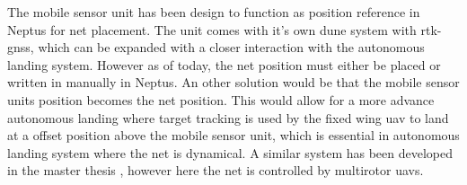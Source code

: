 The mobile sensor unit has been design to function as position reference in Neptus for net placement. The unit comes with it's own \gls{dune} system with \gls{rtk-gnss}, which can be expanded with a closer interaction with the autonomous landing system. However as of today, the net position must either be placed or written in manually in Neptus. An other solution would be that the mobile sensor units position becomes the net position. This would allow for a more advance autonomous landing where target tracking is used by the fixed wing \gls{uav} to land at a offset position above the mobile sensor unit, which is essential in autonomous landing system where the net is dynamical. A similar system has been developed in the master thesis \citep{Jostein}, however here the net is controlled by multirotor \glspl{uav}.

